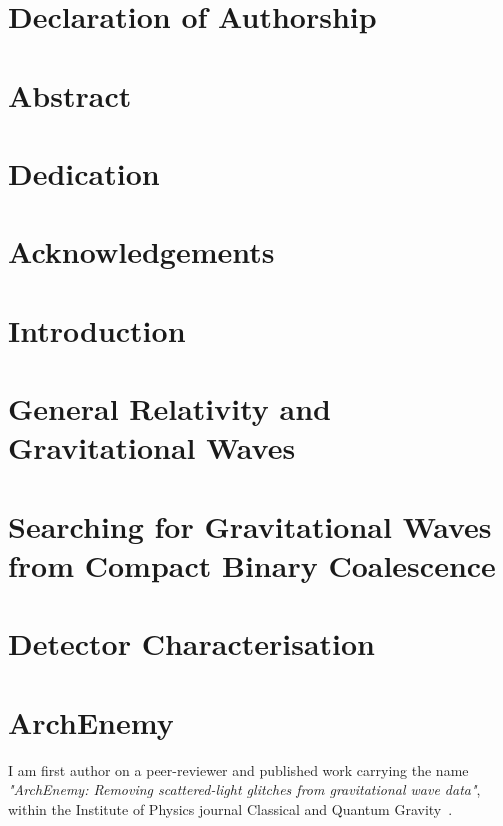 \documentclass[12pt,twoside]{report} %
\begin{document}


\chapter*{Declaration of Authorship}


\chapter*{Abstract}


\chapter*{Dedication}


\chapter*{Acknowledgements}


\tableofcontents

\chapter{Introduction}


\chapter{General Relativity and Gravitational Waves}


\chapter{Searching for Gravitational Waves from Compact Binary Coalescence}


\chapter{Detector Characterisation}


\chapter{ArchEnemy}
I am first author on a peer-reviewer and published work carrying the name \textit{"ArchEnemy: Removing scattered-light glitches from gravitational wave data"}, within the Institute of Physics journal Classical and Quantum Gravity~\cite{ArchEnemy}.

\end{document}
